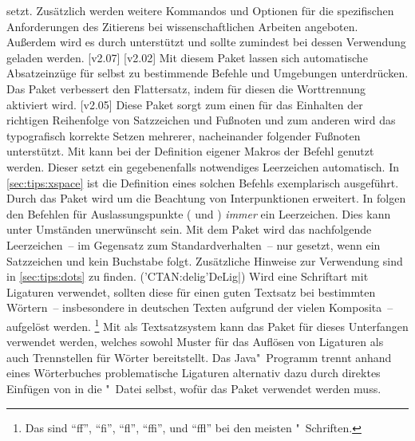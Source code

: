 \begin{DeclarePackages}
  setzt. Zusätzlich werden weitere Kommandos und Optionen für die spezifischen 
  Anforderungen des Zitierens bei wissenschaftlichen Arbeiten angeboten. 
  Außerdem wird es durch  unterstützt und sollte zumindest 
  bei dessen Verwendung geladen werden.
  [v2.07]
[v2.02]
  Mit diesem Paket lassen sich automatische Absatzeinzüge für selbst zu 
  bestimmende Befehle und Umgebungen unterdrücken.
  Das Paket verbessert den Flattersatz, indem für diesen die Worttrennung 
  aktiviert wird.
[v2.05]
  Diese Paket sorgt zum einen für das Einhalten der richtigen Reihenfolge von 
  Satzzeichen und Fußnoten und zum anderen wird das typografisch korrekte 
  Setzen mehrerer, nacheinander folgender Fußnoten unterstützt. 
  Mit  kann bei der Definition eigener Makros der Befehl 
   genutzt werden. Dieser setzt ein gegebenenfalls notwendiges 
  Leerzeichen automatisch. In \autoref{sec:tips:xspace} ist die Definition 
  eines solchen Befehls exemplarisch ausgeführt. Durch das Paket 
   wird  um die Beachtung von 
  Interpunktionen erweitert.
  In  folgen den Befehlen für Auslassungspunkte ( und 
  ) \emph{immer} ein Leerzeichen. Dies kann unter Umständen 
  unerwünscht sein. Mit dem Paket  wird das nachfolgende 
  Leerzeichen~-- im Gegensatz zum Standardverhalten~-- nur gesetzt, wenn ein 
  Satzzeichen und kein Buchstabe folgt. Zusätzliche Hinweise zur Verwendung 
  sind in \autoref{sec:tips:dots} zu finden.
(\Application'CTAN:delig'{DeLig|})
  Wird eine Schriftart mit Ligaturen verwendet, sollten diese für einen guten 
  Textsatz bei bestimmten Wörtern~-- insbesondere in deutschen Texten aufgrund 
  der vielen Komposita~-- aufgelöst werden.%
  \footnote{%
    Das sind \enquote{ff}, \enquote{fi}, \enquote{fl}, \enquote{ffi}, und 
    \enquote{ffl} bei den meisten "~Schriften.%
  }
  Mit  als Textsatzsystem kann das Paket  
  für dieses Unterfangen verwendet werden, welches sowohl Muster für das 
  Auflösen von Ligaturen als auch Trennstellen für Wörter bereitstellt. 
  Das Java"~Programm  trennt anhand eines Wörterbuches 
  problematische Ligaturen alternativ dazu durch direktes Einfügen von 
   in die "~Datei selbst, wofür das Paket 
   verwendet werden muss.
\end{DeclarePackages}
%



